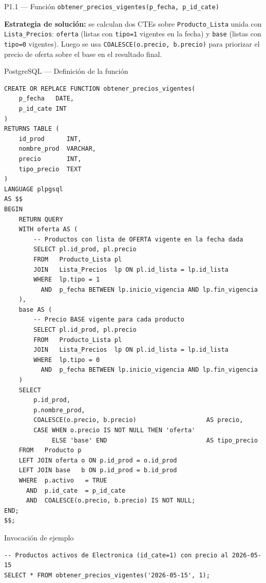 \documentclass[12pt,a4paper]{article}
\begin{document}
\vspace{0.4cm}

\begin{querybox}{P1.1 --- Función \texttt{obtener\_precios\_vigentes(p\_fecha, p\_id\_cate)}}

\textbf{Estrategia de solución:} se calculan dos CTEs sobre \texttt{Producto\_Lista}
unida con \texttt{Lista\_Precios}: \texttt{oferta} (listas con \texttt{tipo=1}
vigentes en la fecha) y \texttt{base} (listas con \texttt{tipo=0} vigentes).
Luego se usa \texttt{COALESCE(o.precio, b.precio)} para priorizar el precio
de oferta sobre el base en el resultado final.

\vspace{0.4cm}

\begin{sqlbox}{PostgreSQL --- Definición de la función}
\begin{lstlisting}[style=sqlstyle]
CREATE OR REPLACE FUNCTION obtener_precios_vigentes(
    p_fecha   DATE,
    p_id_cate INT
)
RETURNS TABLE (
    id_prod      INT,
    nombre_prod  VARCHAR,
    precio       INT,
    tipo_precio  TEXT
)
LANGUAGE plpgsql
AS $$
BEGIN
    RETURN QUERY
    WITH oferta AS (
        -- Productos con lista de OFERTA vigente en la fecha dada
        SELECT pl.id_prod, pl.precio
        FROM   Producto_Lista pl
        JOIN   Lista_Precios  lp ON pl.id_lista = lp.id_lista
        WHERE  lp.tipo = 1
          AND  p_fecha BETWEEN lp.inicio_vigencia AND lp.fin_vigencia
    ),
    base AS (
        -- Precio BASE vigente para cada producto
        SELECT pl.id_prod, pl.precio
        FROM   Producto_Lista pl
        JOIN   Lista_Precios  lp ON pl.id_lista = lp.id_lista
        WHERE  lp.tipo = 0
          AND  p_fecha BETWEEN lp.inicio_vigencia AND lp.fin_vigencia
    )
    SELECT
        p.id_prod,
        p.nombre_prod,
        COALESCE(o.precio, b.precio)                   AS precio,
        CASE WHEN o.precio IS NOT NULL THEN 'oferta'
             ELSE 'base' END                           AS tipo_precio
    FROM   Producto p
    LEFT JOIN oferta o ON p.id_prod = o.id_prod
    LEFT JOIN base   b ON p.id_prod = b.id_prod
    WHERE  p.activo   = TRUE
      AND  p.id_cate  = p_id_cate
      AND  COALESCE(o.precio, b.precio) IS NOT NULL;
END;
$$;
\end{lstlisting}
\end{sqlbox}

\vspace{0.4cm}
\begin{sqlbox}{Invocación de ejemplo}
\begin{lstlisting}[style=sqlstyle]
-- Productos activos de Electronica (id_cate=1) con precio al 2026-05-15
SELECT * FROM obtener_precios_vigentes('2026-05-15', 1);
\end{lstlisting}
\end{sqlbox}


\end{querybox}
\end{document}
